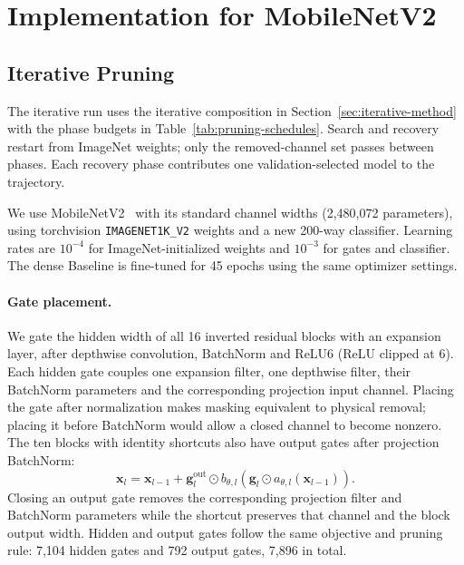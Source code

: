 \section{Implementation for MobileNetV2}
\label{app:implementation-mobilenetv2}

\subsection{Iterative Pruning}
\label{sec:mbv2-iterative-implementation}
The iterative run uses the iterative composition in Section~\ref{sec:iterative-method} with
the phase budgets in Table~\ref{tab:pruning-schedules}. Search and recovery restart from ImageNet
weights; only the removed-channel set passes between phases. Each recovery
phase contributes one validation-selected model to the trajectory.

We use MobileNetV2~\cite{sandler2018mobilenetv2} with its standard
channel widths (2{,}480{,}072 parameters), using torchvision
\texttt{IMAGENET1K\_V2} weights and a new 200-way classifier.
Learning rates are $10^{-4}$ for ImageNet-initialized weights and
$10^{-3}$ for gates and classifier. The dense Baseline is fine-tuned
for 45 epochs using the same optimizer settings.

\paragraph{Gate placement.}
We gate the hidden width of all 16 inverted residual blocks with
an expansion layer, after depthwise convolution, BatchNorm and
ReLU6 (ReLU clipped at 6). Each hidden gate couples one expansion filter, one depthwise
filter, their BatchNorm parameters and the corresponding projection
input channel. Placing the gate after normalization makes masking
equivalent to physical removal; placing it before BatchNorm would
allow a closed channel to become nonzero. The ten blocks with identity
shortcuts also have output gates after projection BatchNorm:
\begin{equation}
\mathbf{x}_l=\mathbf{x}_{l-1}
+\mathbf{g}^{\mathrm{out}}_l\odot
b_{\theta,l}(\mathbf{g}_l\odot a_{\theta,l}(\mathbf{x}_{l-1})).
\end{equation}
Closing an output gate removes the corresponding projection filter
and BatchNorm parameters while the shortcut preserves that channel
and the block output width. Hidden and output gates follow the same
objective and pruning rule: 7{,}104 hidden gates and 792 output gates,
7{,}896 in total.

